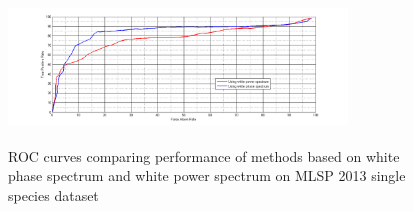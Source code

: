 \documentclass[a4paper]{article}
\begin{document}
 
\begin{figure}[!ht]
	\centering
	\includegraphics[width=9cm, height=4cm]{ROC_data_2_gd_vs_spectogram_white}
	\caption{ROC curves comparing performance of methods based on white phase spectrum and white power spectrum on MLSP 2013 single species dataset }   
\end{figure} 

 
\end{document}
